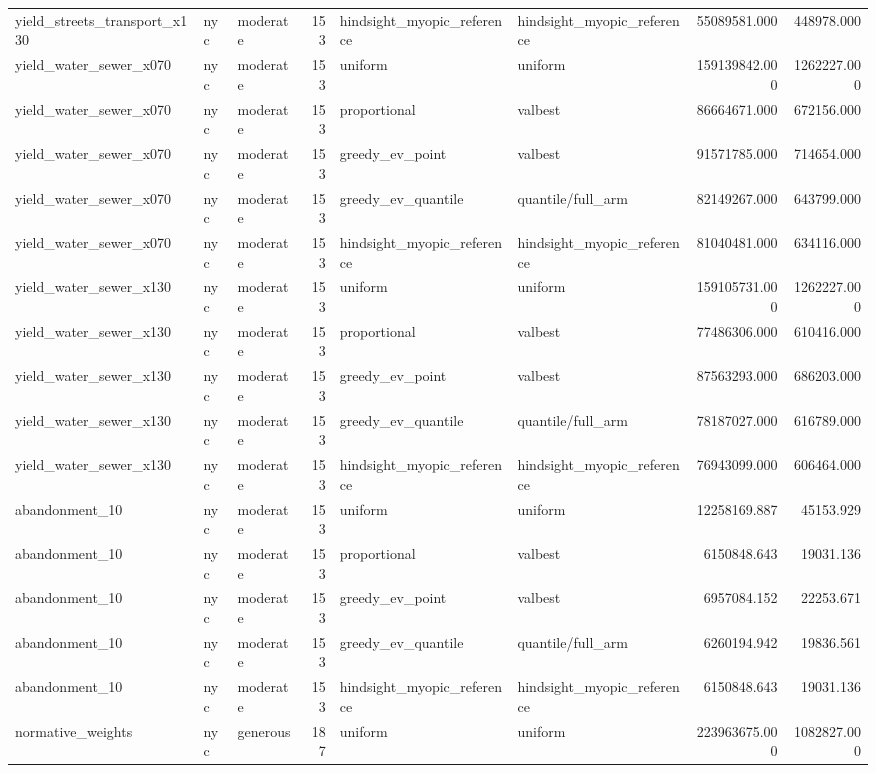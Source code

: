 \begin{tabular}{lllrllrr}
yield\_streets\_transport\_x130 & nyc & moderate & 153 & hindsight\_myopic\_reference & hindsight\_myopic\_reference & 55089581.000 & 448978.000 \\
yield\_water\_sewer\_x070 & nyc & moderate & 153 & uniform & uniform & 159139842.000 & 1262227.000 \\
yield\_water\_sewer\_x070 & nyc & moderate & 153 & proportional & valbest & 86664671.000 & 672156.000 \\
yield\_water\_sewer\_x070 & nyc & moderate & 153 & greedy\_ev\_point & valbest & 91571785.000 & 714654.000 \\
yield\_water\_sewer\_x070 & nyc & moderate & 153 & greedy\_ev\_quantile & quantile/full\_arm & 82149267.000 & 643799.000 \\
yield\_water\_sewer\_x070 & nyc & moderate & 153 & hindsight\_myopic\_reference & hindsight\_myopic\_reference & 81040481.000 & 634116.000 \\
yield\_water\_sewer\_x130 & nyc & moderate & 153 & uniform & uniform & 159105731.000 & 1262227.000 \\
yield\_water\_sewer\_x130 & nyc & moderate & 153 & proportional & valbest & 77486306.000 & 610416.000 \\
yield\_water\_sewer\_x130 & nyc & moderate & 153 & greedy\_ev\_point & valbest & 87563293.000 & 686203.000 \\
yield\_water\_sewer\_x130 & nyc & moderate & 153 & greedy\_ev\_quantile & quantile/full\_arm & 78187027.000 & 616789.000 \\
yield\_water\_sewer\_x130 & nyc & moderate & 153 & hindsight\_myopic\_reference & hindsight\_myopic\_reference & 76943099.000 & 606464.000 \\
abandonment\_10 & nyc & moderate & 153 & uniform & uniform & 12258169.887 & 45153.929 \\
abandonment\_10 & nyc & moderate & 153 & proportional & valbest & 6150848.643 & 19031.136 \\
abandonment\_10 & nyc & moderate & 153 & greedy\_ev\_point & valbest & 6957084.152 & 22253.671 \\
abandonment\_10 & nyc & moderate & 153 & greedy\_ev\_quantile & quantile/full\_arm & 6260194.942 & 19836.561 \\
abandonment\_10 & nyc & moderate & 153 & hindsight\_myopic\_reference & hindsight\_myopic\_reference & 6150848.643 & 19031.136 \\
normative\_weights & nyc & generous & 187 & uniform & uniform & 223963675.000 & 1082827.000 \\

\end{tabular}
